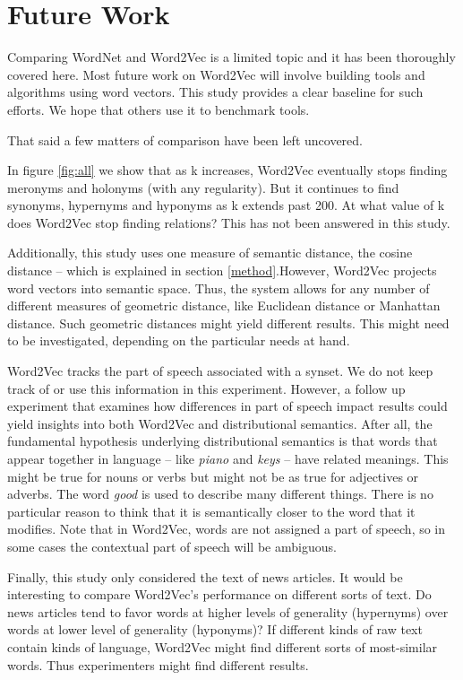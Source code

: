 \documentclass[titlepage]{article}
\begin{document}
\section{Future Work} \label{Future Work}

Comparing WordNet and Word2Vec is a limited topic and it has been thoroughly covered here. Most future work on Word2Vec will involve building tools and algorithms using word vectors. This study provides a clear baseline for such efforts. We hope that others use it to benchmark tools. 

That said a few matters of comparison have been left uncovered. 

In figure \ref{fig:all} we show that as k increases, Word2Vec eventually stops finding meronyms and holonyms (with any regularity). But it continues to find synonyms, hypernyms and hyponyms as k extends past 200. At what value of k does Word2Vec stop finding relations? This has not been answered in this study.

Additionally, this study uses one measure of semantic distance, the cosine distance -- which is explained in section \ref{method}.However, Word2Vec projects word vectors into semantic space. Thus, the system allows for any number of different measures of geometric distance, like Euclidean distance or Manhattan distance. Such geometric distances might yield different results. This might need to be investigated, depending on the particular needs at hand.

Word2Vec tracks the part of speech associated with a synset. We do not keep track of or use this information in this experiment. However, a follow up experiment that examines how differences in part of speech impact results could yield insights into both Word2Vec and distributional semantics. After all, the fundamental hypothesis underlying distributional semantics is that words that appear together in language -- like \textit{piano} and \textit{keys} -- have related meanings. This might be true for nouns or verbs but might not be as true for adjectives or adverbs. The word \textit{good} is used to describe many different things. There is no particular reason to think that it is semantically closer to the word that it modifies. Note that in Word2Vec, words are not assigned a part of speech, so in some cases the contextual part of speech will be ambiguous.

Finally, this study only considered the text of news articles. It would be interesting to compare Word2Vec's performance on different sorts of text. Do news articles tend to favor words at higher levels of generality (hypernyms) over words at lower level of generality (hyponyms)? If different kinds of raw text contain kinds of language, Word2Vec might find different sorts of most-similar words. Thus experimenters might find different results.
\end{document}
